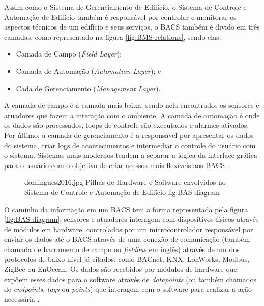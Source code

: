 Assim como o Sistema de Gerenciamento de Edifício, o Sistema de Controle e Automação de Edifício também é responsável por controlar e monitorar os aspectos técnicos de um edifício e seus serviços, o BACS também é divido em três camadas, como representado na figura \ref{fig:BMS-relations}, sendo elas:
\begin{itemize}
    \item Camada de Campo (\emph{Field Layer});
    \item Camada de Automação (\emph{Automation Layer}); e 
    \item Cada de Gerenciamento (\emph{Management Layer}).
\end{itemize}
A camada de campo é a camada mais baixa, sendo nela encontrados os sensores e atuadores que fazem a interação com o ambiente. A camada de automação é onde os dados são processados, loops de controle são executados e alarmes ativados. Por último, a camada de gerenciamento é a responsável por apresentar os dados do sistema, criar logs de acontecimentos e intermediar o controle do usuário com o sistema. Sistemas mais modernos tendem a separar a lógica da interface gráfica para o usuário com o objetivo de criar acessos mais flexíveis aos BACS \cite{Domingues2016}.

\begin{figure}[h!]
    {domingues2016.jpg}                 %
    {Pilhas de Hardware e Software envolvidos no Sistema de Controle e Automação de Edifício}     %
    {fig:BAS-diagram}                      %
\end{figure}
O caminho da informação em um BACS tem a forma representada pela figura \ref{fig:BAS-diagram}, sensores e atuadores interagem com dispositivos físicos através de módulos em hardware, controlados por um microcontrolador responsável por enviar os dados até o BACS através de uma conexão de comunicação (também chamada de barramento de campo ou \emph{fieldbus} em inglês) através de um dos protocolos de baixo nível já citados, como BACnet, KNX, LonWorks, Modbus, ZigBee ou EnOcean. Os dados são recebidos por módulos de hardware que expõem esses dados para o software através de \emph{datapoints} (ou também chamados de \emph{endpoints}, \emph{tags} ou \emph{points}) que interagem com o software para realizar a ação necessária \cite{Domingues2016}.